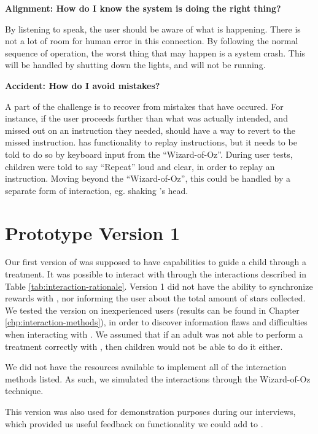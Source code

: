 \textbf{Alignment: How do I know the system is doing the right thing?}

By listening to \buddy{} speak, the user should be aware of what is happening. There is not a lot of room for human error in this connection. By following the normal sequence of operation, the worst thing that may happen is a system crash. This will be handled by shutting down the lights, and \buddy{} will not be running.  

\textbf{Accident: How do I avoid mistakes?}

A part of the challenge is to recover from mistakes that have occured. For instance, if the user proceeds further than what was actually intended, and missed out on an instruction they needed, \buddy{} should have a way to revert to the missed instruction. \ab{} has functionality to replay instructions, but it needs to be told to do so by keyboard input from the ``Wizard-of-Oz''. During user tests, children were told to say ``Repeat'' loud and clear, in order to replay an instruction. Moving beyond the ``Wizard-of-Oz'', this could be handled by a separate form of interaction, eg. shaking \ab{}'s head.       


 

\section{Prototype Version 1}
\label{sec:proto1}

Our first version of \ab{} was supposed to have capabilities to guide a child through a treatment. It was possible to interact with \ab{} through the interactions described in Table \ref{tab:interaction-rationale}. Version 1 did not have the ability to synchronize rewards with \app{}, nor informing the user about the total amount of stars collected. We tested the version on inexperienced users (results can be found in Chapter \ref{chp:interaction-methods}), in order to discover information flaws and difficulties when interacting with \ab{}. We assumed that if an adult was not able to perform a treatment correctly with \ab{}, then children would not be able to do it either.  

We did not have the resources available to implement all of the interaction methods listed. As such, we simulated the interactions through the Wizard-of-Oz technique\cite{wilson1988rapid}.

This version was also used for demonstration purposes during our interviews, which provided us useful feedback on functionality we could add to \ab{}.           
	
